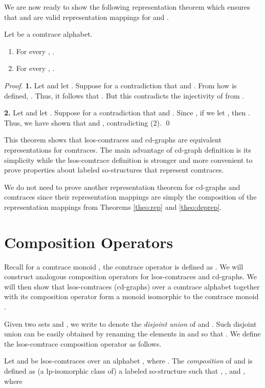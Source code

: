 \documentclass{llncs}
\begin{document}
We are now ready to show the following representation theorem which ensures that  and  are valid representation mappings for  and .

\begin{theorem} Let  be a comtrace alphabet.
\begin{enumerate}
\item For every , .
\item For every , .
\end{enumerate}
\label{theo:deprep}
\end{theorem}
\begin{proof}\textbf{1. } Let  and let . Suppose for a contradiction that  and . From how  is defined, . Thus, it follows that . But this contradicts the injectivity of  from .

\textbf{2. } Let  and let . Suppose for a contradiction that  and . Since , if we let , then  . Thus, we have shown that  and , contradicting  (2).
\qed 
\end{proof}

This theorem shows that lsos-comtraces and cd-graphs are equivalent representations for comtraces.  The main advantage of cd-graph definition is its simplicity while the lsos-comtrace definition is stronger and more convenient to prove properties about labeled so-structures that represent comtraces. 

We do not need to prove another representation theorem for cd-graphs and comtraces since their representation mappings are simply the composition of the representation mappings from Theorems \ref{theo:rep} and \ref{theo:deprep}.

\section{Composition Operators}
Recall for a comtrace monoid , the comtrace operator  is defined as . We will construct analogous composition operators for lsos-comtraces and cd-graphs. We will then show that lsos-comtraces (cd-graphs) over a comtrace alphabet  together with its composition operator form a monoid isomorphic to the comtrace monoid .

Given two sets  and , we  write  to denote the \emph{disjoint union} of  and . Such disjoint union can be easily obtained by renaming the elements in  and  so that . We define the lsos-comtrace composition operator as follows.


\begin{definition} Let  and  be lsos-comtraces over an alphabet , where . The \emph{composition}  of  and  is defined as (a lp-isomorphic class of) a labeled so-structure  such that , , and , where\smallskip\\
\mbox{\hspace{1.5cm}}\\
\mbox{\hspace{1.5cm}} \EOD
\end{definition}
\end{document}
